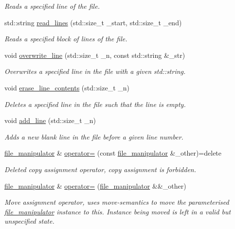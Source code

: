 \begin{DoxyCompactItemize}
\begin{DoxyCompactList}\small\item\em Reads a specified line of the file. \end{DoxyCompactList}\item 
std\+::string \hyperlink{classcrsc_1_1file__manipulator_a78815e4b2a8deee39e41201df9edf3cc}{read\+\_\+lines} (std\+::size\+\_\+t \+\_\+start, std\+::size\+\_\+t \+\_\+end)
\begin{DoxyCompactList}\small\item\em Reads a specified block of lines of the file. \end{DoxyCompactList}\item 
void \hyperlink{classcrsc_1_1file__manipulator_a8a366c35a45967bab7b21e36252b0420}{overwrite\+\_\+line} (std\+::size\+\_\+t \+\_\+n, const std\+::string \&\+\_\+str)
\begin{DoxyCompactList}\small\item\em Overwrites a specified line in the file with a given std\+::string. \end{DoxyCompactList}\item 
void \hyperlink{classcrsc_1_1file__manipulator_a8e9f64f113388de81089b61baf38aecb}{erase\+\_\+line\+\_\+contents} (std\+::size\+\_\+t \+\_\+n)
\begin{DoxyCompactList}\small\item\em Deletes a specified line in the file such that the line is empty. \end{DoxyCompactList}\item 
void \hyperlink{classcrsc_1_1file__manipulator_ad47c6f46aa5bc0724b7f94c54a9d3387}{add\+\_\+line} (std\+::size\+\_\+t \+\_\+n)
\begin{DoxyCompactList}\small\item\em Adds a new blank line in the file before a given line number. \end{DoxyCompactList}\item 
\hyperlink{classcrsc_1_1file__manipulator}{file\+\_\+manipulator} \& \hyperlink{classcrsc_1_1file__manipulator_a3bb44b3925ec606ccb5cbbce1515b4a8}{operator=} (const \hyperlink{classcrsc_1_1file__manipulator}{file\+\_\+manipulator} \&\+\_\+other)=delete
\begin{DoxyCompactList}\small\item\em Deleted copy assignment operator, copy assignment is forbidden. \end{DoxyCompactList}\item 
\hyperlink{classcrsc_1_1file__manipulator}{file\+\_\+manipulator} \& \hyperlink{classcrsc_1_1file__manipulator_a03170482ca6b01cc49e9cbc8284ede3d}{operator=} (\hyperlink{classcrsc_1_1file__manipulator}{file\+\_\+manipulator} \&\&\+\_\+other)
\begin{DoxyCompactList}\small\item\em Move assignment operator, uses move-\/semantics to move the parameterised \hyperlink{classcrsc_1_1file__manipulator}{file\+\_\+manipulator} instance to this. Instance being moved is left in a valid but unspecified state. \end{DoxyCompactList}\end{DoxyCompactItemize}
